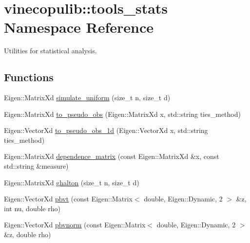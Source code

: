 \hypertarget{namespacevinecopulib_1_1tools__stats}{}\section{vinecopulib\+:\+:tools\+\_\+stats Namespace Reference}
\label{namespacevinecopulib_1_1tools__stats}


Utilities for statistical analysis.  


\subsection*{Functions}
\begin{DoxyCompactItemize}
\item 
Eigen\+::\+Matrix\+Xd \hyperlink{namespacevinecopulib_1_1tools__stats_a78efaf3caf538201cdb881dd2780b242}{simulate\+\_\+uniform} (size\+\_\+t n, size\+\_\+t d)
\item 
Eigen\+::\+Matrix\+Xd \hyperlink{namespacevinecopulib_1_1tools__stats_afda41507cee7cba84602e28e56cfcd99}{to\+\_\+pseudo\+\_\+obs} (Eigen\+::\+Matrix\+Xd x, std\+::string ties\+\_\+method)
\item 
Eigen\+::\+Vector\+Xd \hyperlink{namespacevinecopulib_1_1tools__stats_a9e4849a2a908703a68e92e0c0633237f}{to\+\_\+pseudo\+\_\+obs\+\_\+1d} (Eigen\+::\+Vector\+Xd x, std\+::string ties\+\_\+method)
\item 
Eigen\+::\+Matrix\+Xd \hyperlink{namespacevinecopulib_1_1tools__stats_ae2eca8e0fc4ac2d7eeb0226845214847}{dependence\+\_\+matrix} (const Eigen\+::\+Matrix\+Xd \&x, const std\+::string \&measure)
\item 
Eigen\+::\+Matrix\+Xd \hyperlink{namespacevinecopulib_1_1tools__stats_ae0ba8000d0941c82677df06ce6d1d564}{ghalton} (size\+\_\+t n, size\+\_\+t d)
\item 
Eigen\+::\+Vector\+Xd \hyperlink{namespacevinecopulib_1_1tools__stats_a1e81bac0b4e1e9e0158b800a7db0d1af}{pbvt} (const Eigen\+::\+Matrix$<$ double, Eigen\+::\+Dynamic, 2 $>$ \&z, int nu, double rho)
\item 
Eigen\+::\+Vector\+Xd \hyperlink{namespacevinecopulib_1_1tools__stats_a6867eea2d193c7e5d78b30b9991397ad}{pbvnorm} (const Eigen\+::\+Matrix$<$ double, Eigen\+::\+Dynamic, 2 $>$ \&z, double rho)
\end{DoxyCompactItemize}
